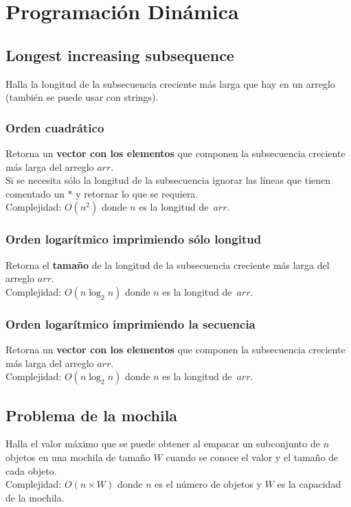 \documentclass[10pt,letterpaper,twocolumn]{article}
\newcommand{\source}[1]{
  
  \dotfill
}
\begin{document}
\section{Programación Dinámica}
  \subsection{Longest increasing subsequence}
    Halla la longitud de la subsecuencia creciente más larga que hay en un arreglo (también se puede usar con strings).
    \subsubsection{Orden cuadrático}
      Retorna un \textbf{vector con los elementos} que componen la subsecuencia creciente más larga del arreglo $arr$.\\
      Si se necesita sólo la longitud de la subsecuencia ignorar las líneas que tienen comentado un $*$ y retornar lo que se requiera.\\
      Complejidad: $O(n^2)$ donde $n$ es la longitud de~$arr$.
      \source{src/lisn2.cpp}
    \subsubsection{Orden logarítmico imprimiendo sólo longitud}
      Retorna el \textbf{tamaño} de la longitud de la subsecuencia creciente más larga del arreglo $arr$.\\
      Complejidad: $O(n \log_2 n)$ donde $n$ es la longitud de~$arr$.
      \source{src/lislognlength.cpp}
    \subsubsection{Orden logarítmico imprimiendo la secuencia}
      Retorna un \textbf{vector con los elementos} que componen la subsecuencia creciente más larga del arreglo $arr$.\\
      Complejidad: $O(n \log_2 n)$ donde $n$ es la longitud de~$arr$.
      \source{src/lislognelements.cpp}
  \subsection{Problema de la mochila}
  Halla el valor máximo que se puede obtener al empacar un subconjunto de $n$ objetos en una mochila de tamaño $W$ cuando se conoce el valor y el tamaño de cada objeto.\\
Complejidad: $O(n \times W)$ donde $n$ es el número de objetos y $W$ es la capacidad de la mochila.\\
  \source{./src/knapsack.cpp}
\end{document}
